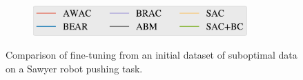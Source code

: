 \begin{figure}[H]
\begin{center}
\begin{subfigure}[b]{0.45\textwidth}
        \includegraphics[width=0.9\textwidth]{awac/figures/rig/pusher_random_legend-crop.pdf}
    \end{subfigure}
  \end{center}
  \vspace{0.1cm}
  \caption{
  Comparison of fine-tuning from an initial dataset of suboptimal data on a Sawyer robot pushing task.
  }
  \vspace{-0.5cm}
 \label{fig:gcrl}
\end{figure}
